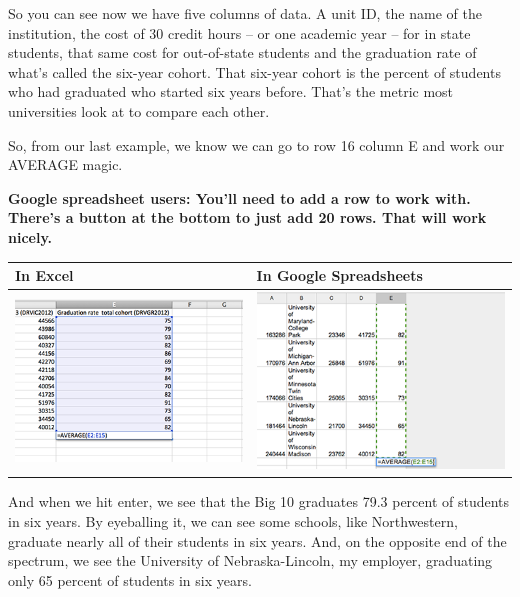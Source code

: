 \documentclass[]{book}
\begin{document}
So you can see now we have five columns of data. A unit ID, the name of the institution, the cost of 30 credit hours -- or one academic year -- for in state students, that same cost for out-of-state students and the graduation rate of what's called the six-year cohort. That six-year cohort is the percent of students who had graduated who started six years before. That's the metric most universities look at to compare each other.

So, from our last example, we know we can go to row 16 column E and work our AVERAGE magic.

\textbf{Google spreadsheet users: You'll need to add a row to work with. There's a button at the bottom to just add 20 rows. That will work nicely.}

\begin{longtable}[]{@{}ll@{}}
\toprule
In Excel & In Google Spreadsheets\tabularnewline
\midrule
\endhead
\includegraphics{images/excelmean5.png} & \includegraphics{images/googlemean5.png}\tabularnewline
\bottomrule
\end{longtable}

And when we hit enter, we see that the Big 10 graduates 79.3 percent of students in six years. By eyeballing it, we can see some schools, like Northwestern, graduate nearly all of their students in six years. And, on the opposite end of the spectrum, we see the University of Nebraska-Lincoln, my employer, graduating only 65 percent of students in six years.
\end{document}
